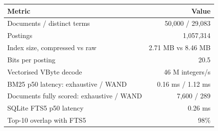 \begin{tabular}{lr}
\toprule
Metric & Value \\
\midrule
Documents / distinct terms & 50,000 / 29,083 \\
Postings & 1,057,314 \\
Index size, compressed vs raw & 2.71 MB vs 8.46 MB \\
Bits per posting & 20.5 \\
Vectorised VByte decode & 46 M integers/s \\
BM25 p50 latency: exhaustive / WAND & 0.16 ms / 1.12 ms \\
Documents fully scored: exhaustive / WAND & 7,600 / 289 \\
SQLite FTS5 p50 latency & 0.26 ms \\
Top-10 overlap with FTS5 & 98\% \\
\bottomrule
\end{tabular}
